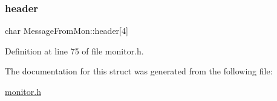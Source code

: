 \subsubsection{\texorpdfstring{header}{header}}
{\footnotesize\ttfamily char Message\+From\+Mon\+::header\mbox{[}4\mbox{]}}



Definition at line 75 of file monitor.\+h.



The documentation for this struct was generated from the following file\+:\begin{DoxyCompactItemize}
\item 
\hyperlink{monitor_8h}{monitor.\+h}\end{DoxyCompactItemize}
